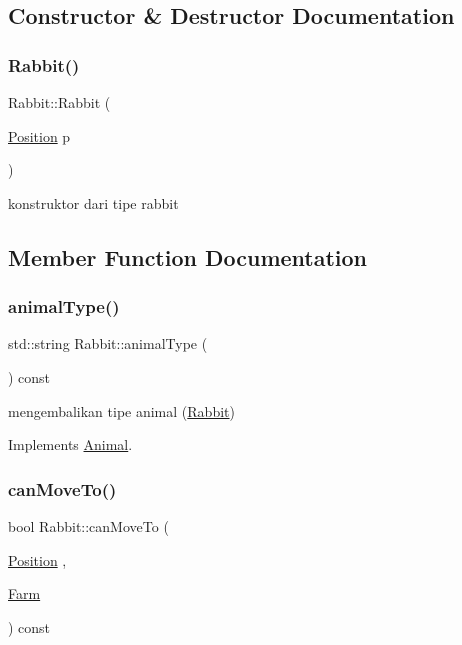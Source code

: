\subsection{Constructor \& Destructor Documentation}
\mbox{\label{class_rabbit_a524dc1e292bc748391550c81ae81336b}} 
\subsubsection{\texorpdfstring{Rabbit()}{Rabbit()}}
{\footnotesize\ttfamily Rabbit\+::\+Rabbit (\begin{DoxyParamCaption}\item[{\mbox{\hyperlink{class_position}{Position}}}]{p }\end{DoxyParamCaption})}

konstruktor dari tipe rabbit 

\subsection{Member Function Documentation}
\mbox{\label{class_rabbit_a26169c2de4f8cf4f72d51c0796b96a37}} 
\subsubsection{\texorpdfstring{animalType()}{animalType()}}
{\footnotesize\ttfamily std\+::string Rabbit\+::animal\+Type (\begin{DoxyParamCaption}{ }\end{DoxyParamCaption}) const\hspace{0.3cm}{\ttfamily [virtual]}}

mengembalikan tipe animal (\mbox{\hyperlink{class_rabbit}{Rabbit}}) 

Implements \mbox{\hyperlink{class_animal_a1969cf8cf77a7900207420ae26f856e9}{Animal}}.

\mbox{\label{class_rabbit_aedf048f173d55caa45576081f93dc931}} 
\subsubsection{\texorpdfstring{canMoveTo()}{canMoveTo()}}
{\footnotesize\ttfamily bool Rabbit\+::can\+Move\+To (\begin{DoxyParamCaption}\item[{\mbox{\hyperlink{class_position}{Position}}}]{,  }\item[{\mbox{\hyperlink{class_farm}{Farm}}}]{ }\end{DoxyParamCaption}) const\hspace{0.3cm}{\ttfamily [virtual]}}

